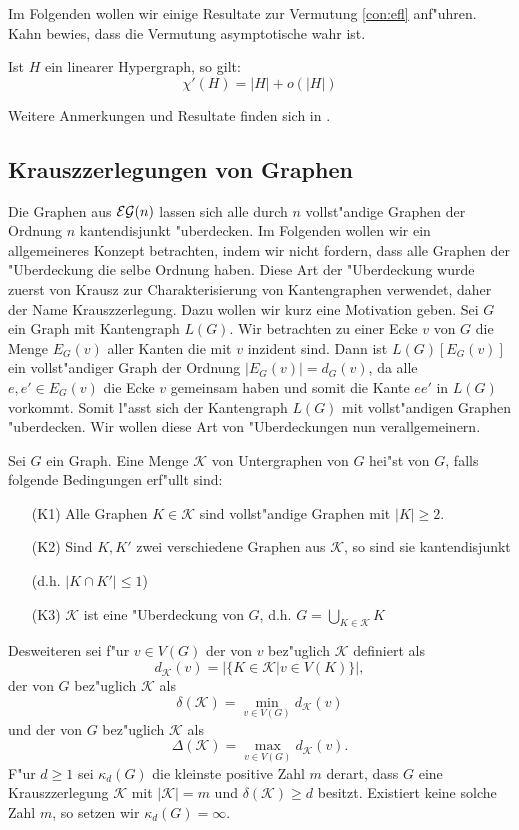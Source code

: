 Im Folgenden wollen wir einige Resultate zur Vermutung \ref{con:efl} anf"uhren. Kahn \cite{Kahn92} bewies, dass die Vermutung asymptotische wahr ist.

\begin{theorem}
  Ist $H$ ein linearer Hypergraph, so gilt: $$\chi'(H) = |H| + o(|H|)$$
  \label{thm:kahn}
\end{theorem}
Weitere Anmerkungen und Resultate finden sich in \cite{RomeroS2007}.


\subsection{Krauszzerlegungen von Graphen}
Die Graphen aus ${\cal EG}(n)$ lassen sich alle durch $n$ vollst"andige Graphen der Ordnung $n$ kantendisjunkt "uberdecken. Im Folgenden wollen wir ein allgemeineres Konzept betrachten, indem wir nicht fordern, dass alle Graphen der "Uberdeckung die selbe Ordnung haben. 
Diese Art der "Uberdeckung wurde zuerst von Krausz \cite{Krausz43} zur Charakterisierung von Kantengraphen verwendet, daher der Name Krauszzerlegung. 
Dazu wollen wir kurz eine Motivation geben. Sei $G$ ein Graph mit Kantengraph $L(G)$. Wir betrachten zu einer Ecke $v$ von $G$ die Menge $E_G(v)$ aller Kanten die mit $v$ inzident sind. Dann ist $L(G)[E_G(v)]$ ein vollst"andiger Graph der Ordnung $|E_G(v)| = d_G(v)$, da alle $e,e'\in E_G(v)$ die Ecke $v$ gemeinsam haben und somit die Kante $ee'$ in $L(G)$ vorkommt. 
Somit l"asst sich der Kantengraph $L(G)$ mit vollst"andigen Graphen "uberdecken. Wir wollen diese Art von "Uberdeckungen nun verallgemeinern.

  Sei $G$ ein Graph. Eine Menge $\mathcal K$ von Untergraphen von $G$ hei"st  von $G$, falls folgende Bedingungen erf"ullt sind:
  \begin{enumerate}
    \item[\rm{(K1)}] Alle Graphen $K\in \mathcal{K}$ sind vollst"andige Graphen mit $|K| \geq 2$.
    \item[\rm{(K2)}] Sind $K,K'$ zwei verschiedene Graphen aus $\mathcal{K}$, so sind sie kantendisjunkt 

      (d.h. $|K\cap K'| \leq 1$)
    \item[\rm{(K3)}] $\mathcal K$ ist eine "Uberdeckung von $G$, d.h.  $G=\bigcup\limits_{K\in \mathcal K}K$
  \end{enumerate}
  Desweiteren sei f"ur $v\in V(G)$ der  von $v$ bez"uglich $\mathcal K$ definiert als $$d_{\mathcal{K}}(v) = |\{ K\in\mathcal K| v \in V(K)\}|,$$ der  von $G$ bez"uglich $\mathcal K$ als $$\delta(\mathcal K) = \min\limits_{v\in V(G)}d_{\mathcal{K}}(v)$$ und der  von $G$ bez"uglich $\mathcal{K}$ als $$\Delta(\mathcal{K}) = \max\limits_{v\in V(G)}d_{\mathcal{K}}(v).$$
  F"ur $d \geq 1$ sei $\kappa_d(G)$ die kleinste positive Zahl $m$ derart, dass $G$ eine Krauszzerlegung $\mathcal K$ mit $|\mathcal K| = m$ und $\delta(\mathcal K) \geq d$ besitzt. Existiert keine solche Zahl $m$, so setzen wir $\kappa_{d}(G) = \infty$.

